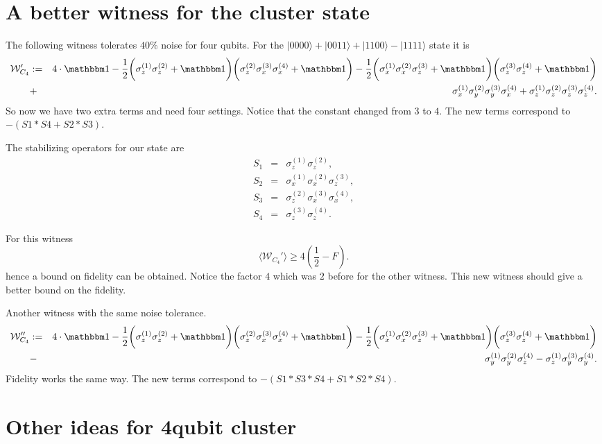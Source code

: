 \documentclass[amsmath,amssymb]{revtex4}
\newcommand{\eea}{\end{eqnarray}}
\newcommand{\bea}{\begin{eqnarray}}
\newcommand{\exs}[1]{\ensuremath{\langle{#1}\rangle}}
\newcommand{\eins}{\ensuremath{\mathbbm 1}}
\newcommand{\WW}{\ensuremath{\mathcal{W}}}
\newcommand{\ket}[1]{\ensuremath{|#1\rangle}}
\begin{document}
\section{A better witness for the cluster state}

The following witness tolerates $40\%$ noise for four qubits.
For the $\ket{0000}+\ket{0011}+\ket{1100}-\ket{1111}$
state it is 
\bea \WW_{C_4}' &:=& 4\cdot\eins- \frac{1}{2}
\bigg(\sigma_z^{(1)}\sigma_z^{(2)}+\eins\bigg)
\bigg(\sigma_z^{(2)}\sigma_x^{(3)}\sigma_x^{(4)}+\eins\bigg) -
\frac{1}{2}
\bigg(\sigma_x^{(1)}\sigma_x^{(2)}\sigma_z^{(3)}+\eins\bigg)
\bigg(\sigma_z^{(3)}\sigma_z^{(4)}+\eins\bigg)\nonumber\\&+&
\sigma_x^{(1)}\sigma_y^{(2)}\sigma_y^{(3)}\sigma_x^{(4)}+
\sigma_z^{(1)}\sigma_z^{(2)}\sigma_z^{(3)}\sigma_z^{(4)}. \label{CN2B} \eea
So now we have two extra terms and need four settings.
Notice that the constant changed from $3$ to $4$.
The new terms correspond to $-(S1*S4+S2*S3)$.

The stabilizing operators for our state are
\begin{eqnarray}
S_1&=&\sigma_z^{(1)}\sigma_z^{(2)},\nonumber\\
S_2&=&\sigma_x^{(1)}\sigma_x^{(2)}\sigma_z^{(3)},\nonumber\\
S_3&=&\sigma_z^{(2)}\sigma_x^{(3)}\sigma_x^{(4)},\nonumber\\
S_4&=&\sigma_z^{(3)}\sigma_z^{(4)}.
\end{eqnarray} 

For this witness
\begin{equation}
\exs{\WW_{C_4}'}\ge 4 (\frac{1}{2}-F).
\end{equation} 
hence a bound on fidelity can be obtained.
Notice the factor $4$ which was $2$ before for the other witness.
This new witness should give a better bound on the fidelity.

Another witness with the same noise tolerance.
\bea \WW_{C_4}'' &:=& 4\cdot\eins- \frac{1}{2}
\bigg(\sigma_z^{(1)}\sigma_z^{(2)}+\eins\bigg)
\bigg(\sigma_z^{(2)}\sigma_x^{(3)}\sigma_x^{(4)}+\eins\bigg) -
\frac{1}{2}
\bigg(\sigma_x^{(1)}\sigma_x^{(2)}\sigma_z^{(3)}+\eins\bigg)
\bigg(\sigma_z^{(3)}\sigma_z^{(4)}+\eins\bigg)\nonumber\\&-&
\sigma_y^{(1)}\sigma_y^{(2)}\sigma_z^{(4)}-
\sigma_z^{(1)}\sigma_y^{(3)}\sigma_y^{(4)}. \label{CN2C} \eea
Fidelity works the same way.
The new terms correspond to $-(S1*S3*S4+S1*S2*S4)$.

\section{Other ideas for 4qubit cluster}
\end{document}
